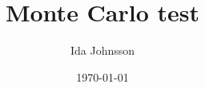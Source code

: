 \documentclass[12pt]{article}
\begin{document}
\title{Monte Carlo test}
\author{Ida Johnsson}
\date{\today}
\maketitle
\noindent
{}
\clearpage










\end{document}
